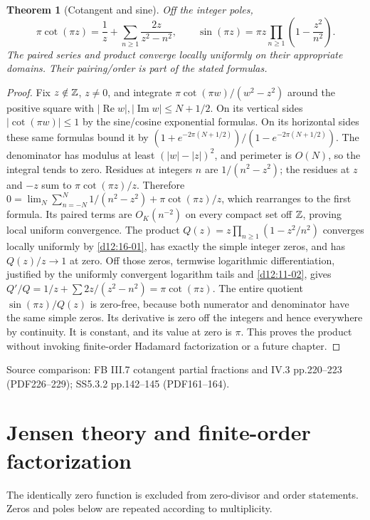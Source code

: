\documentclass[11pt,a4paper,openany]{book}
\newtheorem{theorem}{Theorem}[chapter]
\theoremstyle{definition}
\theoremstyle{remark}\newtheorem{remark}[theorem]{Remark}
\DeclareMathOperator{\Ree}{Re}\DeclareMathOperator{\Imm}{Im}
\newcommand{\family}[1]{}
\newcommand{\source}[1]{\par\begingroup\small\sffamily\color{black!65}Source comparison: #1\par\endgroup}
\begin{document}
\begin{theorem}[Cotangent and sine]\family{D12.16.08}\label{d12:16-08}
Off the integer poles,
\[
 \pi\cot(\pi z)=\frac1z+\sum_{n\ge1}\frac{2z}{z^2-n^2},
 \qquad
 \sin(\pi z)=\pi z\prod_{n\ge1}\left(1-\frac{z^2}{n^2}\right).
\]
The paired series and product converge locally uniformly on their appropriate domains. Their pairing/order is part of the stated formulas.
\end{theorem}
\begin{proof}
Fix $z\notin\mathbb Z$, $z\ne0$, and integrate $\pi\cot(\pi w)/(w^2-z^2)$ around the positive square with $|\Ree w|,|\Imm w|\le N+1/2$. On its vertical sides $|\cot(\pi w)|\le1$ by the sine/cosine exponential formulas. On its horizontal sides these same formulas bound it by $(1+e^{-2\pi(N+1/2)})/(1-e^{-2\pi(N+1/2)})$. The denominator has modulus at least $(|w|-|z|)^2$, and perimeter is $O(N)$, so the integral tends to zero. Residues at integers $n$ are $1/(n^2-z^2)$; the residues at $z$ and $-z$ sum to $\pi\cot(\pi z)/z$. Therefore
$0=\lim_N\sum_{n=-N}^N1/(n^2-z^2)+\pi\cot(\pi z)/z$, which rearranges to the first formula. Its paired terms are $O_K(n^{-2})$ on every compact set off $\mathbb Z$, proving local uniform convergence.
The product $Q(z)=z\prod_{n\ge1}(1-z^2/n^2)$ converges locally uniformly by \cref{d12:16-01}, has exactly the simple integer zeros, and has $Q(z)/z\to1$ at zero. Off those zeros, termwise logarithmic differentiation, justified by the uniformly convergent logarithm tails and \cref{d12:11-02}, gives $Q'/Q=1/z+\sum2z/(z^2-n^2)=\pi\cot(\pi z)$. The entire quotient $\sin(\pi z)/Q(z)$ is zero-free, because both numerator and denominator have the same simple zeros. Its derivative is zero off the integers and hence everywhere by continuity. It is constant, and its value at zero is $\pi$. This proves the product without invoking finite-order Hadamard factorization or a future chapter.
\end{proof}
\source{FB III.7 cotangent partial fractions and IV.3 pp.220--223 (PDF226--229); SS5.3.2 pp.142--145 (PDF161--164).}



\chapter{Jensen theory and finite-order factorization}\label{ch:d12-17}

The identically zero function is excluded from zero-divisor and order
statements. Zeros and poles below are repeated according to multiplicity.
\end{document}
